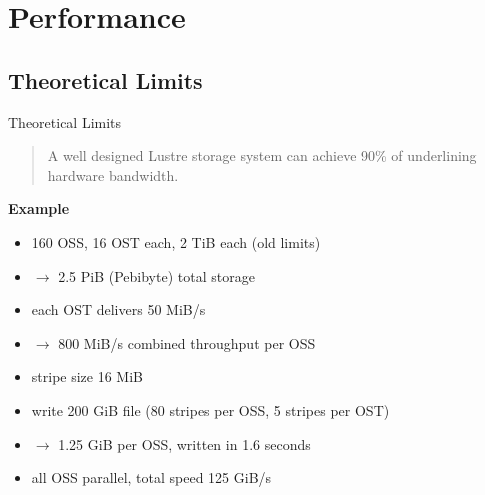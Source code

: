 \section{Performance}
\sectiontoc

\subsection{Theoretical Limits}
\begin{frame}{Theoretical Limits}
    \begin{quote}
        A well designed Lustre storage system can achieve
        90\% of underlining hardware bandwidth.

        \hspace*{}
    \end{quote}

    \pause

    \textbf{Example}

    \begin{itemize}
        \item<+-> 160 OSS, 16 OST each, 2 TiB each (old limits)
        \item<+-> $\rightarrow$ 2.5 PiB (Pebibyte) total storage
        \item<+-> each OST delivers 50 MiB/s
        \item<+-> $\rightarrow$ 800 MiB/s combined throughput per OSS
        \item<+-> stripe size 16 MiB
        \item<+-> write 200 GiB file (80 stripes per OSS, 5 stripes per OST)
        \item<+-> $\rightarrow$ 1.25 GiB per OSS, written in 1.6 seconds
        \item<+-> all OSS parallel, total speed 125 GiB/s
    \end{itemize}
\end{frame}

